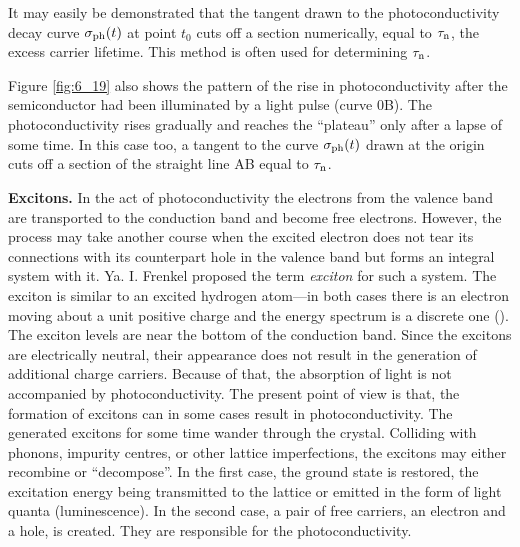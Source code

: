 It may easily be demonstrated that the tangent drawn to the photoconductivity decay curve $\sigma_{\text{ph}}(t)$ at point $t_0$ cuts off a section numerically, equal to $\tau_{\text{n}}$, the excess carrier lifetime. This method is often used for determining $\tau_{\text{n}}$.

Figure \ref{fig:6_19} also shows the pattern of the rise in photoconductivity after the semiconductor had been illuminated by a light pulse (curve $0$B). The photoconductivity rises gradually and reaches the ``plateau'' only after a lapse of some time. In this case too, a tangent to the curve $\sigma_{\text{ph}}(t)$ drawn at the origin cuts off a section of the straight line AB equal to $\tau_{\text{n}}$.

\textbf{Excitons.} In the act of photoconductivity the electrons from the valence band are transported to the conduction band and become free electrons. However, the process may take another course when the excited electron does not tear its connections with its counterpart hole in the valence band but forms an integral system with it. Ya. I. Frenkel proposed the term \textit{exciton} for such a system. The exciton is similar to an excited hydrogen atom---in both cases there is an electron moving about a unit positive charge and the energy spectrum is a discrete one (). The exciton levels are near the bottom of the conduction band. Since the excitons are electrically neutral, their appearance does not result in the generation of additional charge carriers. Because of that, the absorption of light is not accompanied by photoconductivity. The present point of view is that,
the formation of excitons can in some cases result in photoconductivity. The generated excitons for some time wander through the crystal. Colliding with phonons, impurity centres, or other lattice imperfections, the excitons may either recombine or ``decompose''. In the first case, the ground state is restored, the excitation energy being transmitted to the lattice or emitted in the form of light quanta
(luminescence). In the second case, a pair of free carriers, an electron and a hole, is created. They are responsible for the photoconductivity.

